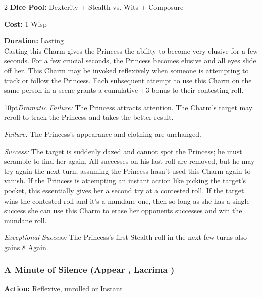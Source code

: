 \begin{multicols}{2}
\noindent \textbf{Dice Pool:} Dexterity + Stealth vs. Wits + Composure

\noindent \textbf{Cost:} 1 Wisp 

\noindent \textbf{Duration:} Lasting \\

\noindent Casting this Charm gives the Princess the ability to become very elusive for a few seconds. For a few crucial seconds, the Princess becomes elusive and all eyes slide off her. This Charm may be invoked reflexively when someone is attempting to track or follow the Princess. Each subsequent attempt to use this Charm on the same person in a scene grants a cumulative +3 bonus to their contesting roll.

\begin{myindentpar}{10pt}\emph{Dramatic Failure:} The Princess attracts attention. The Charm's target may reroll to track the Princess and takes the better result. 

    \emph{Failure:} The Princess's appearance and clothing are unchanged.

    \emph{Success:} The target is suddenly dazed and cannot spot the Princess; he must scramble to find her again. All successes on his last roll are removed, but he may try again the next turn, assuming the Princess hasn't used this Charm again to vanish. If the Princess is attempting an instant action like picking the target's pocket, this essentially gives her a second try at a contested roll. If the target wins the contested roll and it's a mundane one, then so long as she has a single success she can use this Charm to erase her opponents successes and win the mundane roll. 

    \emph{Exceptional Success:} The Princess's first Stealth roll in the next few turns also gains 8 Again.\end{myindentpar}

\subsubsection*{A Minute of Silence (Appear \textbullet, Lacrima \textbullet )}

\noindent \textbf{Action:} Reflexive, unrolled or Instant


\end{multicols}
